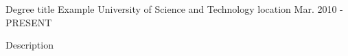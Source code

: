 \begin{cventries}
  \cventry
    {Degree title}
    {Example University of Science and Technology}
    {location}
    {Mar. 2010 - PRESENT}
    {
      \begin{cvitems}
        \item {Description}
      \end{cvitems}
  }{}
\end{cventries}


